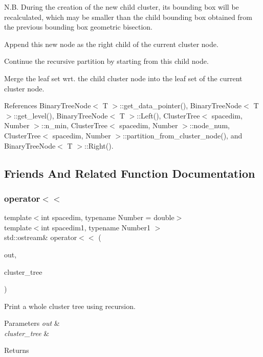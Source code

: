 N.\+B. During the creation of the new child cluster, its bounding box will be recalculated, which may be smaller than the child bounding box obtained from the previous bounding box geometric bisection.

Append this new node as the right child of the current cluster node.

Continue the recursive partition by starting from this child node.

Merge the leaf set wrt. the child cluster node into the leaf set of the current cluster node.

References Binary\+Tree\+Node$<$ T $>$\+::get\+\_\+data\+\_\+pointer(), Binary\+Tree\+Node$<$ T $>$\+::get\+\_\+level(), Binary\+Tree\+Node$<$ T $>$\+::\+Left(), Cluster\+Tree$<$ spacedim, Number $>$\+::n\+\_\+min, Cluster\+Tree$<$ spacedim, Number $>$\+::node\+\_\+num, Cluster\+Tree$<$ spacedim, Number $>$\+::partition\+\_\+from\+\_\+cluster\+\_\+node(), and Binary\+Tree\+Node$<$ T $>$\+::\+Right().



\subsection{Friends And Related Function Documentation}
\mbox{\label{classClusterTree_a67abb576193ee1ad87882a2b748df865}} 
\subsubsection{\texorpdfstring{operator$<$$<$}{operator<<}}
{\footnotesize\ttfamily template$<$int spacedim, typename Number = double$>$ \\
template$<$int spacedim1, typename Number1 $>$ \\
std\+::ostream\& operator$<$$<$ (\begin{DoxyParamCaption}\item[{std\+::ostream \&}]{out,  }\item[{const \hyperlink{classClusterTree}{Cluster\+Tree}$<$ spacedim1, Number1 $>$ \&}]{cluster\+\_\+tree }\end{DoxyParamCaption})\hspace{0.3cm}{\ttfamily [friend]}}

Print a whole cluster tree using recursion. 
\begin{DoxyParams}{Parameters}
{\em out} & \\
\hline
{\em cluster\+\_\+tree} & \\
\hline
\end{DoxyParams}
\begin{DoxyReturn}{Returns}

\end{DoxyReturn}


